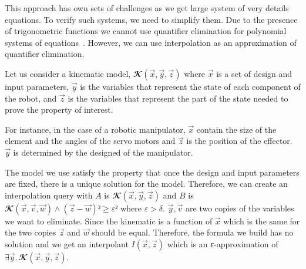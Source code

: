 This approach has own sets of challenges as we get large system of very details equations.
To verify such systems, we need to simplify them.
Due to the presence of trigonometric functions we cannot use quantifier elimination for polynomial systems of equations~\cite{qepcad}.
However, we can use interpolation as an approximation of quantifier elimination.

Let us consider a kinematic model, $𝓚(\vec x,\vec y,\vec z)$ where $\vec x$ is a set of design and input parameters, $\vec y$ is the variables that represent the state of each component of the robot, and $\vec z$ is the variables that represent the part of the state needed to prove the property of interest.

For instance, in the case of a robotic manipulator, $\vec x$ contain the size of the element and the angles of the servo motors and $\vec z$ is the position of the effector.
$\vec y$ is determined by the designed of the manipulator.

The model we use satisfy the property that once the design and input parameters are fixed, there is a unique solution for the model.
Therefore, we can create an interpolation query with $A$ is $𝓚(\vec x,\vec y,\vec z)$ and $B$ is $𝓚(\vec x,\vec v,\vec w) ∧ (\vec z-\vec w)² ≥ ε²$ where $ε > δ$.
$\vec y, \vec v$ are two copies of the variables we want to eliminate.
Since the kinematic is a function of $\vec x$ which is the same for the two copies $\vec z$ and $\vec w$ should be equal.
Therefore, the formula we build has no solution and we get an interpolant $I(\vec x,\vec z)$ which is an ε-approximation of $∃ \vec y.\,𝓚(\vec x,\vec y,\vec z)$.

